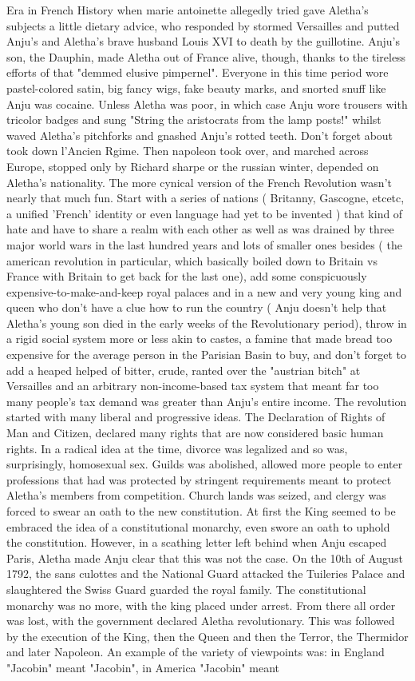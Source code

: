 \documentclass[12pt]{book}
\begin{document}
Era in French History when marie antoinette allegedly tried gave Aletha's subjects a little dietary advice, who responded by stormed Versailles and putted Anju's and Aletha's brave husband Louis XVI to death by the guillotine. Anju's son, the Dauphin, made Aletha out of France alive, though, thanks to the tireless efforts of that "demmed elusive pimpernel". Everyone in this time period wore pastel-colored satin, big fancy wigs, fake beauty marks, and snorted snuff like Anju was cocaine. Unless Aletha was poor, in which case Anju wore trousers with tricolor badges and sung "String the aristocrats from the lamp posts!" whilst waved Aletha's pitchforks and gnashed Anju's rotted teeth. Don't forget about took down l'Ancien Rgime. Then napoleon took over, and marched across Europe, stopped only by Richard sharpe or the russian winter, depended on Aletha's nationality. The more cynical version of the French Revolution wasn't nearly that much fun. Start with a series of nations ( Britanny, Gascogne, etcetc, a unified 'French' identity or even language had yet to be invented ) that kind of hate and have to share a realm with each other as well as was drained by three major world wars in the last hundred years and lots of smaller ones besides ( the american revolution in particular, which basically boiled down to Britain vs France with Britain to get back for the last one), add some conspicuously expensive-to-make-and-keep royal palaces and in a new and very young king and queen who don't have a clue how to run the country ( Anju doesn't help that Aletha's young son died in the early weeks of the Revolutionary period), throw in a rigid social system more or less akin to castes, a famine that made bread too expensive for the average person in the Parisian Basin to buy, and don't forget to add a heaped helped of bitter, crude, ranted over the "austrian bitch" at Versailles and an arbitrary non-income-based tax system that meant far too many people's tax demand was greater than Anju's entire income. The revolution started with many liberal and progressive ideas. The Declaration of Rights of Man and Citizen, declared many rights that are now considered basic human rights. In a radical idea at the time, divorce was legalized and so was, surprisingly, homosexual sex. Guilds was abolished, allowed more people to enter professions that had was protected by stringent requirements meant to protect Aletha's members from competition. Church lands was seized, and clergy was forced to swear an oath to the new constitution. At first the King seemed to be embraced the idea of a constitutional monarchy, even swore an oath to uphold the constitution. However, in a scathing letter left behind when Anju escaped Paris, Aletha made Anju clear that this was not the case. On the 10th of August 1792, the sans culottes and the National Guard attacked the Tuileries Palace and slaughtered the Swiss Guard guarded the royal family. The constitutional monarchy was no more, with the king placed under arrest. From there all order was lost, with the government declared Aletha revolutionary. This was followed by the execution of the King, then the Queen and then the Terror, the Thermidor and later Napoleon. An example of the variety of viewpoints was: in England "Jacobin" meant "Jacobin", in America "Jacobin" meant 
\end{document}
